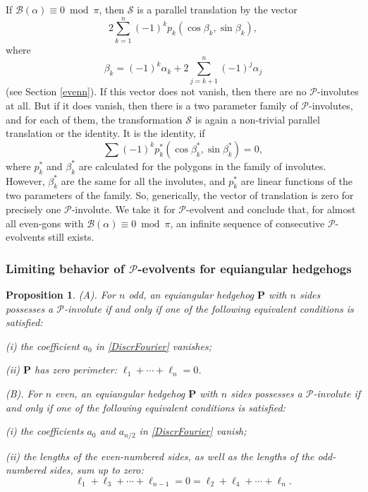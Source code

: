 \documentclass[12pt]{article}
\newtheorem{proposition}[lemma]{Proposition}
\newcommand{\B}{\mathcal{B}}
\newcommand{\Pev}{\mathcal{P}}
\renewcommand{\P}{\mathbf{P}}
\begin{document}
If $\B(\alpha)\equiv0\bmod\pi$, then $\mathcal S$ is a parallel translation by the vector$$2\sum_{k=1}^n(-1)^kp_k(\cos\beta_k,\sin\beta_k),$$where$$\beta_k=(-1)^k\alpha_k+2\sum_{j=k+1}^n(-1)^j\alpha_j$$(see Section \ref{evenn}). If this vector does not vanish, then there are no $\Pev$-involutes at all. But if it does vanish, then there is a two parameter family of $\Pev$-involutes, and for each of them, the transformation $\mathcal S$ is again a non-trivial parallel translation or the identity. It is the identity, if$$\sum(-1)^kp^\ast_k(\cos\beta^\ast_k,\sin\beta^\ast_k)=0,$$where $p^\ast_k$ and $\beta_k^\ast$ are calculated for the polygons in the family of involutes. However, $\beta^\ast_k$ are the same for all the involutes, and $p_k^\ast$ are linear functions of the two parameters of the family. So, generically, the vector of translation is zero for precisely one $\Pev$-involute. We  take it for $\Pev$-evolvent and conclude that, for almost all even-gons with $\B(\alpha)\equiv0\bmod\pi$, an infinite sequence of consecutive $\Pev$-evolvents still exists.

\subsubsection{Limiting behavior of $\Pev$-evolvents for equiangular hedgehogs}

\begin{proposition}
\label{nodd_Pinv_equi}
{\rm (A).} For $n$ odd, an equiangular hedgehog $\P$ with $n$ sides possesses a $\Pev$-involute if and only if one of the following equivalent conditions is satisfied:

{\rm (i)} the coefficient $a_0$ in \eqref{DiscrFourier} vanishes;

{\rm (ii)} $\P$ has zero perimeter: $\ell_1 + \cdots + \ell_n = 0$.\smallskip

{\rm (B).} For $n$ even, an equiangular hedgehog $\P$ with $n$ sides possesses a $\Pev$-involute if and only if one of the following equivalent conditions is satisfied:

{\rm (i)} the coefficients $a_0$ and $a_{n/2}$ in \eqref{DiscrFourier} vanish;

{\rm (ii)} the lengths of the even-numbered sides, as well as the lengths of the odd-numbered sides, sum up to zero:
\begin{equation}
\label{TwoPer}
\ell_1 + \ell_3 + \cdots + \ell_{n-1} = 0 = \ell_2 + \ell_4 + \cdots + \ell_n.
\end{equation}
\end{proposition}
\end{document}
